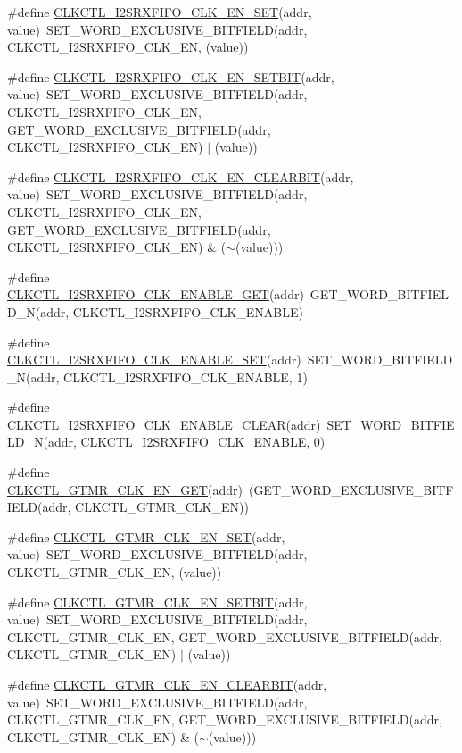 \begin{DoxyCompactItemize}
\item 
\#define \hyperlink{a00544_a1dfac9f713b69d2402227a45aa59b855}{CLKCTL\_\-I2SRXFIFO\_\-CLK\_\-EN\_\-SET}(addr, value)~SET\_\-WORD\_\-EXCLUSIVE\_\-BITFIELD(addr, CLKCTL\_\-I2SRXFIFO\_\-CLK\_\-EN, (value))
\item 
\#define \hyperlink{a00544_aef4e7d917505d0c2a2cda14fc8fcb976}{CLKCTL\_\-I2SRXFIFO\_\-CLK\_\-EN\_\-SETBIT}(addr, value)~SET\_\-WORD\_\-EXCLUSIVE\_\-BITFIELD(addr, CLKCTL\_\-I2SRXFIFO\_\-CLK\_\-EN, GET\_\-WORD\_\-EXCLUSIVE\_\-BITFIELD(addr, CLKCTL\_\-I2SRXFIFO\_\-CLK\_\-EN) $|$ (value))
\item 
\#define \hyperlink{a00544_abdc582ccac51ebaaa7ed4264206786c5}{CLKCTL\_\-I2SRXFIFO\_\-CLK\_\-EN\_\-CLEARBIT}(addr, value)~SET\_\-WORD\_\-EXCLUSIVE\_\-BITFIELD(addr, CLKCTL\_\-I2SRXFIFO\_\-CLK\_\-EN, GET\_\-WORD\_\-EXCLUSIVE\_\-BITFIELD(addr, CLKCTL\_\-I2SRXFIFO\_\-CLK\_\-EN) \& ($\sim$(value)))
\item 
\#define \hyperlink{a00544_adb88dc4f9b403887d770c0bea9899ff7}{CLKCTL\_\-I2SRXFIFO\_\-CLK\_\-ENABLE\_\-GET}(addr)~GET\_\-WORD\_\-BITFIELD\_\-N(addr, CLKCTL\_\-I2SRXFIFO\_\-CLK\_\-ENABLE)
\item 
\#define \hyperlink{a00544_a43c6deb92ff4f3a1d781f21f4b76770d}{CLKCTL\_\-I2SRXFIFO\_\-CLK\_\-ENABLE\_\-SET}(addr)~SET\_\-WORD\_\-BITFIELD\_\-N(addr, CLKCTL\_\-I2SRXFIFO\_\-CLK\_\-ENABLE, 1)
\item 
\#define \hyperlink{a00544_a3d7be18903716f8bc9b401547899a8b7}{CLKCTL\_\-I2SRXFIFO\_\-CLK\_\-ENABLE\_\-CLEAR}(addr)~SET\_\-WORD\_\-BITFIELD\_\-N(addr, CLKCTL\_\-I2SRXFIFO\_\-CLK\_\-ENABLE, 0)
\item 
\#define \hyperlink{a00544_aed81991f34db9859ee9aa28c147348bb}{CLKCTL\_\-GTMR\_\-CLK\_\-EN\_\-GET}(addr)~(GET\_\-WORD\_\-EXCLUSIVE\_\-BITFIELD(addr, CLKCTL\_\-GTMR\_\-CLK\_\-EN))
\item 
\#define \hyperlink{a00544_ab05b0614cdd8066b25372cfed11067ee}{CLKCTL\_\-GTMR\_\-CLK\_\-EN\_\-SET}(addr, value)~SET\_\-WORD\_\-EXCLUSIVE\_\-BITFIELD(addr, CLKCTL\_\-GTMR\_\-CLK\_\-EN, (value))
\item 
\#define \hyperlink{a00544_aa29929c90a5ff6c4144d03765312be65}{CLKCTL\_\-GTMR\_\-CLK\_\-EN\_\-SETBIT}(addr, value)~SET\_\-WORD\_\-EXCLUSIVE\_\-BITFIELD(addr, CLKCTL\_\-GTMR\_\-CLK\_\-EN, GET\_\-WORD\_\-EXCLUSIVE\_\-BITFIELD(addr, CLKCTL\_\-GTMR\_\-CLK\_\-EN) $|$ (value))
\item 
\#define \hyperlink{a00544_a51ec5a768453d1a88bed2c3100f24b9c}{CLKCTL\_\-GTMR\_\-CLK\_\-EN\_\-CLEARBIT}(addr, value)~SET\_\-WORD\_\-EXCLUSIVE\_\-BITFIELD(addr, CLKCTL\_\-GTMR\_\-CLK\_\-EN, GET\_\-WORD\_\-EXCLUSIVE\_\-BITFIELD(addr, CLKCTL\_\-GTMR\_\-CLK\_\-EN) \& ($\sim$(value)))

\end{DoxyCompactItemize}
